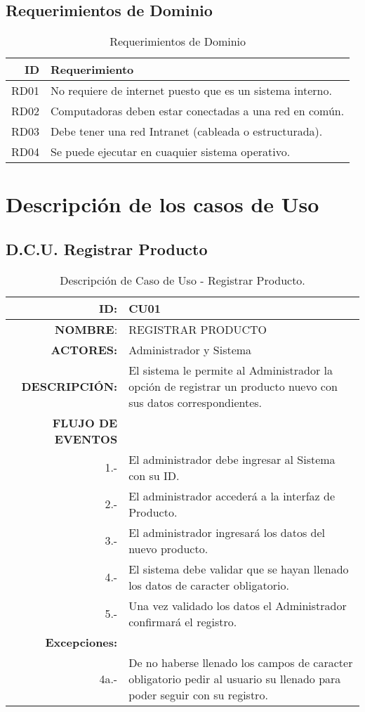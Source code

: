 \documentclass[a4paper,11pt, spanish]{report}
\begin{document}
{{{{{{{{{{{{{    \subsection{Requerimientos de Dominio}
      {\renewcommand{\arraystretch}{1.25}%
      \begin{table}[H]
      \begin{tabularx}{\textwidth}{r|X}
        \textbf{\large ID} & \textbf{\large Requerimiento }\\ \hline
        RD01 & No requiere de internet puesto que es un sistema interno.\\ \hline
        RD02 & Computadoras deben estar conectadas a una red en común.\\\hline
        RD03 & Debe tener una red Intranet (cableada o estructurada).\\\hline
        RD04 & Se puede ejecutar en cuaquier sistema operativo.\\
        \end{tabularx}
      \caption{Requerimientos de Dominio}
      \end{table}

\section{Descripción de los casos de Uso}

\subsection{D.C.U. Registrar Producto}

  {\renewcommand{\arraystretch}{1.25}%
  \begin{table}[H]
  \begin{tabularx}{\textwidth}{r|X}
  \textbf{ID}: & CU01\\\hline
  \textbf{NOMBRE}: & REGISTRAR PRODUCTO\\\hline
  \textbf{ACTORES:} & Administrador y Sistema \\\hline
  \textbf{DESCRIPCIÓN:} & El sistema le permite al Administrador la opción de registrar un producto nuevo con sus datos correspondientes. \\\hline
  \textbf{FLUJO DE EVENTOS}  \\
  1.- & El administrador debe ingresar al Sistema con su ID.\\
  2.- & El administrador accederá a la interfaz de Producto.\\
  3.- & El administrador ingresará los datos del nuevo producto.\\
  4.- & El sistema debe validar que se hayan llenado los datos de caracter obligatorio.\\
  5.- & Una vez validado los datos el Administrador confirmará el registro. \\\hline
  \textbf{Excepciones:} & \\
  4a.- & De no haberse llenado los campos de caracter obligatorio pedir al usuario su llenado para poder seguir con su registro.
  \end{tabularx}
  \caption{Descripción de Caso de Uso - Registrar Producto.}
  \end{table}

}}}}}}}}}}}}}}}
\end{document}
